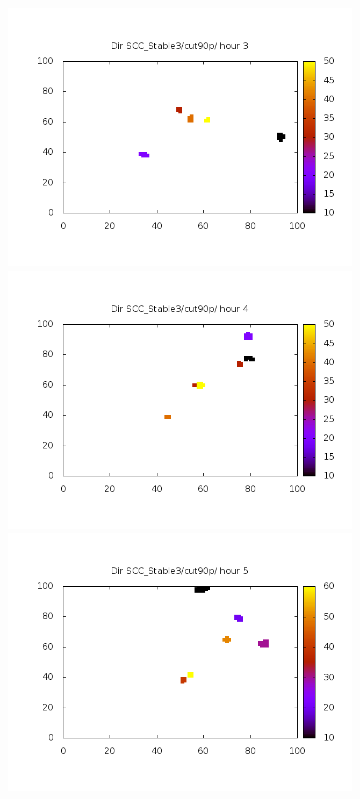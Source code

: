 \documentclass[10pt,a4paper]{article}
\begin{document}
\begin{figure}
\begin{subfigure}[b]{1\textwidth}
\includegraphics[scale=.20]{./img/SCC_Stable3/cut90p/3.png}
\includegraphics[scale=.20]{./img/SCC_Stable3/cut90p/4.png}
\includegraphics[scale=.20]{./img/SCC_Stable3/cut90p/5.png}
\end{subfigure}


\end{figure}
\end{document}
